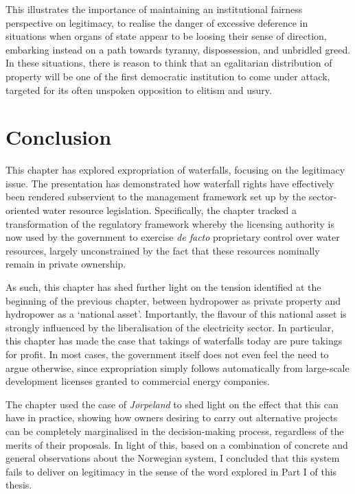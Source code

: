 This illustrates the importance of maintaining an institutional fairness perspective on legitimacy, to realise the danger of excessive deference in situations when organs of state appear to be loosing their sense of direction, embarking instead on a path towards tyranny, dispossession, and unbridled greed. In these situations, there is reason to think that an egalitarian distribution of property will be one of the first democratic institution to come under attack, targeted for its often unspoken opposition to elitism and usury.

\section{Conclusion}\label{sec:5:8}

This chapter has explored expropriation of waterfalls, focusing on the legitimacy issue. The presentation has demonstrated how waterfall rights have effectively been rendered subservient to the management framework set up by the sector-oriented water resource legislation. Specifically, the chapter tracked a transformation of the regulatory framework whereby the licensing authority is now used by the government to exercise {\it de facto} proprietary control over water resources, largely unconstrained by the fact that these resources nominally remain in private ownership.

As such, this chapter has shed further light on the tension identified at the beginning of the previous chapter, between hydropower as private property and hydropower as a `national asset'. Importantly, the flavour of this national asset is strongly influenced by the liberalisation of the electricity sector. In particular, this chapter has made the case that takings of waterfalls today are pure takings for profit. In most cases, the government itself does not even feel the need to argue otherwise, since expropriation simply follows automatically from large-scale development licenses granted to commercial energy companies.

The chapter used the case of {\it Jørpeland} to shed light on the effect that this can have in practice, showing how owners desiring to carry out alternative projects can be completely marginalised in the decision-making process, regardless of the merits of their proposals. In light of this, based on a combination of concrete and general observations about the Norwegian system, I concluded that this system fails to deliver on legitimacy in the sense of the word explored in Part I of this thesis. 

